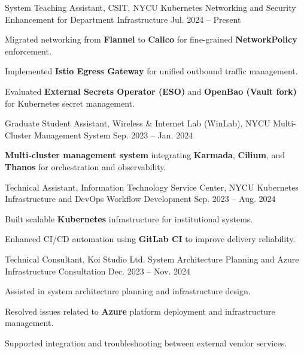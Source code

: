 \begin{cventries}
  \cventry
    {System Teaching Assistant, CSIT, NYCU} %
    {Kubernetes Networking and Security Enhancement for Department Infrastructure} %
    {} %
    {Jul. 2024 -- Present} %
    {
      \begin{cvitems}
        \item {Migrated networking from \textbf{Flannel} to \textbf{Calico} for fine-grained \textbf{NetworkPolicy} enforcement.}
        \item {Implemented \textbf{Istio Egress Gateway} for unified outbound traffic management.}
        \item {Evaluated \textbf{External Secrets Operator (ESO)} and \textbf{OpenBao (Vault fork)} for Kubernetes secret management.}
      \end{cvitems}
    }

  \cventry
    {Graduate Student Assistant, Wireless \& Internet Lab (WinLab), NYCU} %
    {Multi-Cluster Management System} %
    {} %
    {Sep. 2023 -- Jan. 2024} %
    {
      \begin{cvitems}
        \item {\textbf{Multi‑cluster management system} integrating \textbf{Karmada}, \textbf{Cilium}, and \textbf{Thanos} for orchestration and observability.}
      \end{cvitems}
    }

  \cventry
    {Technical Assistant, Information Technology Service Center, NYCU} %
    {Kubernetes Infrastructure and DevOps Workflow Development} %
    {} %
    {Sep. 2023 -- Aug. 2024} %
    {
      \begin{cvitems}
        \item {Built scalable \textbf{Kubernetes} infrastructure for institutional systems.}
        \item {Enhanced CI/CD automation using \textbf{GitLab CI} to improve delivery reliability.}
      \end{cvitems}
    }

  \cventry
    {Technical Consultant, Koi Studio Ltd.} %
    {System Architecture Planning and Azure Infrastructure Consultation} %
    {} %
    {Dec. 2023 -- Nov. 2024} %
    {
      \begin{cvitems}
        \item {Assisted in system architecture planning and infrastructure design.}
        \item {Resolved issues related to \textbf{Azure} platform deployment and infrastructure management.}
        \item {Supported integration and troubleshooting between external vendor services.}
      \end{cvitems}
    }

\end{cventries}
